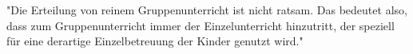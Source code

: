 "Die  Erteilung von reinem Gruppenunterricht ist nicht ratsam. Das
bedeutet also, dass zum Gruppenunterricht immer der Einzelunterricht hinzutritt,
der speziell für eine derartige Einzelbetreuung der Kinder genutzt wird."
\autocite[57]{ernst:die_zukunftsfaehige_musikschule}













